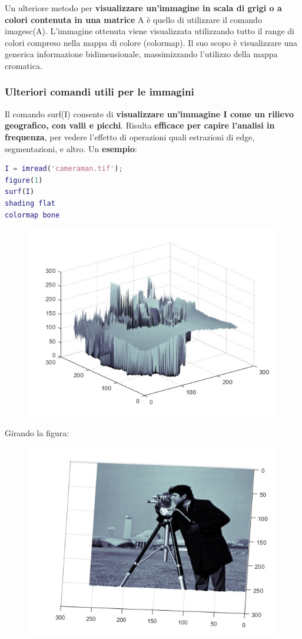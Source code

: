 \documentclass[a4paper]{article}
\begin{document}
	\noindent
	Un ulteriore metodo per \textbf{visualizzare un'immagine in scala di grigi o a colori contenuta in una matrice} \textsf{A} è quello di utilizzare il comando \textsf{imagesc(A)}. L'immagine ottenuta viene visualizzata utilizzando tutto il range di colori compreso nella mappa di colore (colormap). Il suo scopo è visualizzare una generica informazione bidimensionale, massimizzando l'utilizzo della mappa cromatica.\newpage
	
	\subsubsection{Ulteriori comandi utili per le immagini}
	
	Il comando \textsf{surf(I)} consente di \textbf{visualizzare un'immagine \textsf{I} come un rilievo geografico, con valli e picchi}. Risulta \textbf{efficace per capire l'analisi in frequenza}, per vedere l'effetto di operazioni quali estrazioni di edge, segmentazioni, e altro. Un \textcolor{Green4}{\textbf{esempio}}:
	\begin{lstlisting}[language=MATLAB]
I = imread('cameraman.tif');
figure(1)
surf(I)
shading flat
colormap bone\end{lstlisting}
	\begin{figure}[!htp]
		\centering
		\includegraphics[width=.8\textwidth]{img/lab/visualizzazione-segnali_7.jpg}
	\end{figure}
	
	\noindent
	Girando la figura:
	\begin{figure}[!htp]
		\centering
		\includegraphics[width=.8\textwidth]{img/lab/visualizzazione-segnali_8.jpg}
	\end{figure}\newpage
\end{document}

